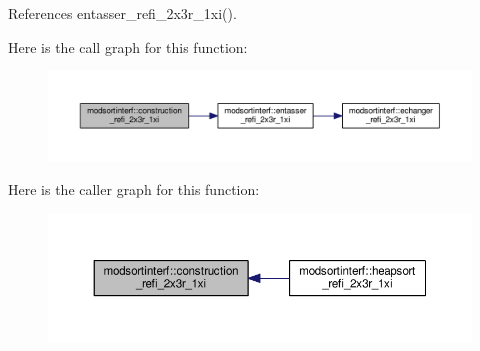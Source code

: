 References entasser\+\_\+refi\+\_\+2x3r\+\_\+1xi().



Here is the call graph for this function\+:\nopagebreak
\begin{figure}[H]
\begin{center}
\leavevmode
\includegraphics[width=350pt]{namespacemodsortinterf_add759648e814227c7eaab60be1136bfd_cgraph}
\end{center}
\end{figure}




Here is the caller graph for this function\+:\nopagebreak
\begin{figure}[H]
\begin{center}
\leavevmode
\includegraphics[width=350pt]{namespacemodsortinterf_add759648e814227c7eaab60be1136bfd_icgraph}
\end{center}
\end{figure}


